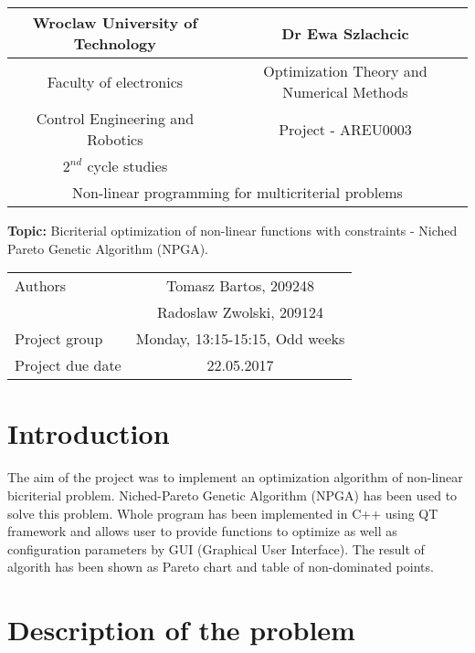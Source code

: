 \documentclass[11pt]{article}
\begin{document}
	\begin{center}
		\begin{tabular}{| c | c |}
		\hline
		Wroclaw University of Technology & Dr Ewa Szlachcic\\ \hline
		Faculty of electronics & Optimization Theory and
		Numerical Methods \\
		Control Engineering and Robotics & Project - AREU0003\\
		$2^{nd}$ cycle studies & \\ \hline
		\multicolumn{2}{c}{Non-linear programming for multicriterial problems}\\
			\hline
	\end{tabular}			
	\end{center}
	
	\textbf{Topic:} Bicriterial optimization of non-linear functions with
	constraints - Niched Pareto Genetic Algorithm (NPGA).
	
	\begin{center}
		\begin{tabular}{| l | c |}
		\hline
		Authors & Tomasz Bartos, 209248\\
				& Radoslaw Zwolski, 209124\\ \hline
		Project group & Monday, 13:15-15:15, Odd weeks\\ \hline
		Project due date & 22.05.2017\\
		\hline
	\end{tabular}
	\end{center}
	
	\newpage

	\section{Introduction}
	
	The aim of the project was to implement an optimization algorithm of non-linear
	bicriterial problem. Niched-Pareto Genetic Algorithm (NPGA) has been used to
	solve this problem. Whole program has been implemented in C++ using QT 	
	framework and allows user to provide functions to optimize as well 
	as configuration parameters by GUI (Graphical User Interface). The result of 
	algorith has been shown as Pareto chart and table of non-dominated points.
	
	\section{Description of the problem}
	
\end{document}
